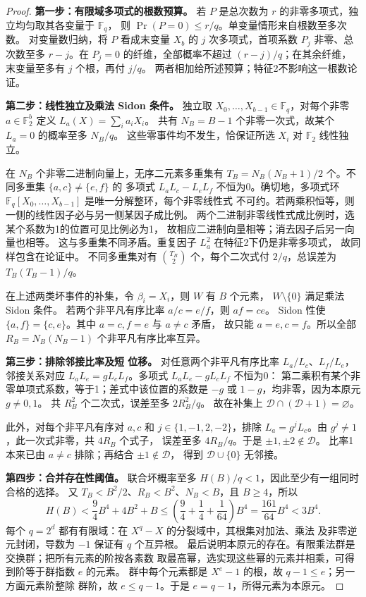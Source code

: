 \documentclass[UTF8,a4paper,11pt,fontset=fandol]{ctexart}
\theoremstyle{remark}
\begin{document}
\begin{proof}
\textbf{第一步：有限域多项式的根数预算。}
若 $P$ 是总次数为 $r$ 的非零多项式，独立均匀取其各变量于 $\mathbb F_q$，
则 $\Pr(P=0)\le r/q$。单变量情形来自根数至多次数。
对变量数归纳，将 $P$ 看成末变量 $X_b$ 的 $j$ 次多项式，首项系数
$P_j$ 非零、总次数至多 $r-j$。在 $P_j=0$ 的纤维，全部概率不超过
$(r-j)/q$；在其余纤维，末变量至多有 $j$ 个根，再付 $j/q$。
两者相加给所述预算；特征2不影响这一根数论证。

\textbf{第二步：线性独立及乘法 Sidon 条件。}
独立取 $X_0,\ldots,X_{b-1}\in\mathbb F_q$，对每个非零
$a\in\mathbb F_2^b$ 定义 $L_a(X)=\sum_i a_iX_i$。
共有 $N_B=B-1$ 个非零一次式，故某个 $L_a=0$ 的概率至多 $N_B/q$。
这些零事件均不发生，恰保证所选 $X_i$ 对 $\mathbb F_2$ 线性独立。

在 $N_B$ 个非零二进制向量上，无序二元素多重集有
$T_B=N_B(N_B+1)/2$ 个。不同多重集 $\{a,c\}\ne\{e,f\}$ 的
多项式 $L_aL_c-L_eL_f$ 不恒为0。确切地，多项式环
$\mathbb F_q[X_0,\ldots,X_{b-1}]$ 是唯一分解整环，每个非零线性式
不可约。若两乘积恒等，则一侧的线性因子必与另一侧某因子成比例。
两个二进制非零线性式成比例时，选某个系数为1的位置可见比例必为1，
故相应二进制向量相等；消去因子后另一向量也相等。
这与多重集不同矛盾。重复因子 $L_a^2$ 在特征2下仍是非零多项式，
故同样包含在论证中。
不同多重集对有 $\binom{T_B}{2}$ 个，每个二次式付 $2/q$，总误差为
$T_B(T_B-1)/q$。

在上述两类坏事件的补集，令 $\beta_i=X_i$，则 $W$ 有 $B$ 个元素，
$W\setminus\{0\}$ 满足乘法 Sidon 条件。
若两个非平凡有序比率 $a/c=e/f$，则 $af=ce$。
Sidon 性使 $\{a,f\}=\{c,e\}$。其中 $a=c,f=e$ 与 $a\ne c$ 矛盾，
故只能 $a=e,c=f$。所以全部 $R_B=N_B(N_B-1)$ 个非平凡有序比率互异。

\textbf{第三步：排除邻接比率及短 位移。}
对任意两个非平凡有序比率 $L_a/L_c$、$L_f/L_e$，邻接关系对应
$L_aL_e=gL_cL_f$。多项式 $L_aL_e-gL_cL_f$ 不恒为0：
第二乘积有某个非零单项式系数，等于1；差式中该位置的系数是
$-g$ 或 $1-g$，均非零，因为本原元 $g\ne0,1$。
共 $R_B^2$ 个二次式，误差至多 $2R_B^2/q$。
故在补集上 $\mathcal D\cap(\mathcal D+1)=\varnothing$。

此外，对每个非平凡有序对 $a,c$ 和 $j\in\{1,-1,2,-2\}$，排除
$L_a=g^jL_c$。由 $g^j\ne1$，此一次式非零，共 $4R_B$ 个式子，
误差至多 $4R_B/q$。于是 $\pm1,\pm2\notin\mathcal D$。
比率1本来已由 $a\ne c$ 排除；再结合 $\pm1\notin\mathcal D$，
得到 $\mathcal D\cup\{0\}$ 无邻接。

\textbf{第四步：合并存在性阈值。}
联合坏概率至多 $H(B)/q<1$，因此至少有一组同时合格的选择。
又 $T_B<B^2/2$、$R_B<B^2$、$N_B<B$，且 $B\ge4$，所以
\[
 H(B)<\frac94B^4+4B^2+B
 \le\left(\frac94+\frac14+\frac1{64}\right)B^4
 =\frac{161}{64}B^4<3B^4.
\]
每个 $q=2^d$ 都有有限域：在 $X^q-X$ 的分裂域中，其根集对加法、乘法
及非零逆元封闭，导数为 $-1$ 保证有 $q$ 个互异根。
最后说明本原元的存在。有限乘法群是交换群；把所有元素的阶按各素数
取最高幂，选实现这些幂的元素并相乘，可得到阶等于群指数 $e$ 的元素。
群中每个元素都是 $X^e-1$ 的根，故 $q-1\le e$；另一方面元素阶整除
群阶，故 $e\le q-1$。于是 $e=q-1$，所得元素为本原元。
\end{proof}
\end{document}

